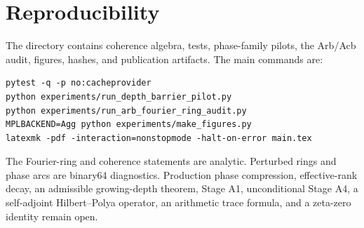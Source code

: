 \documentclass[11pt]{article}
\begin{document}
\section{Reproducibility}

The directory contains coherence algebra, tests, phase-family pilots, the
Arb/Acb audit, figures, hashes, and publication artifacts.  The main commands
are:
\begin{verbatim}
pytest -q -p no:cacheprovider
python experiments/run_depth_barrier_pilot.py
python experiments/run_arb_fourier_ring_audit.py
MPLBACKEND=Agg python experiments/make_figures.py
latexmk -pdf -interaction=nonstopmode -halt-on-error main.tex
\end{verbatim}

The Fourier-ring and coherence statements are analytic.  Perturbed rings and
phase arcs are binary64 diagnostics.  Production phase compression,
effective-rank decay, an admissible growing-depth theorem, Stage A1,
unconditional Stage A4, a self-adjoint Hilbert--Polya operator, an arithmetic
trace formula, and a zeta-zero identity remain open.



\end{document}
